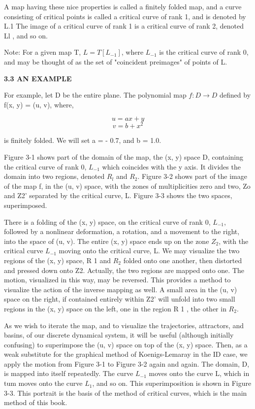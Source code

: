 \documentclass{article}
\begin{document}
A map having these nice properties is called a finitely folded
map, and a curve consisting of critical points is called a critical
curve of rank 1, and is denoted by L.1 The image of a critical curve
of rank 1 is a critical curve of rank 2, denoted Ll , and so on.

Note: For a given map T, $L = T[L_{-1}]$, where $L_{-1}$ is the critical
curve of rank 0, and may be thought of as the set of "coincident preimages"
of points of L.

\hfill

\textbf{3.3 AN EXAMPLE}

\hfill

For example, let D be the entire plane. The polynomial map
$f:D \to D$ defined by f(x, y) = (u, v), where,

\[
u = ax + y
\]
\[
v = b + x^2
\]

is finitely folded. We will set a = - 0.7, and b = 1.0.

Figure 3-1 shows part of the domain of the map, the (x, y) space
D, containing the critical curve of rank 0, $L_{-1}$ which coincides with
the y axis. It divides the domain into two regions, denoted $R_l$ and
$R_2$. Figure 3-2 shows part of the image of the map f, in the (u, v)
space, with the zones of multiplicities zero and two, Zo and Z2' separated
by the critical curve, L. Figure 3-3 shows the two spaces,
superimposed.

There is a folding of the (x, y) space, on the critical curve of rank 0, $L_{-1}$, followed by a nonlinear deformation, a rotation, and a movement to the right, into the space of (u, v). The entire (x, y) space ends up on the zone $Z_2$, with the critical curve $L_{-1}$ moving onto the critical curve, L. 
We may visualize the two regions of the (x, y) space, R 1
and $R_2$ folded onto one another, then distorted and pressed down
onto Z2. Actually, the two regions are mapped onto one.
The motion, visualized in this way, may be reversed. This provides
a method to visualize the action of the inverse mapping as
well. A small area in the (u, v) space on the right, if contained
entirely within Z2' will unfold into two small regions in the (x, y)
space on the left, one in the region R 1 , the other in $R_2$.

As we wish to iterate the map, and to visualize the trajectories,
attractors, and basins, of our discrete dynamical system, it will be
useful (although initially confusing) to superimpose the (u, v) space
on top of the (x, y) space. Then, as a weak substitute for the graphical
method of Koenigs-Lemaray in the ID case, we apply the
motion from Figure 3-1 to Figure 3-2 again and again. The domain,
D, is mapped into itself repeatedly. The curve $L_{-1}$ moves onto the
curve L, which in tum moves onto the curve $L_1$, and so on. This
superimposition is shown in Figure 3-3. This portrait is the basis of
the method of critical curves, which is the main method of this
book.
\end{document}
